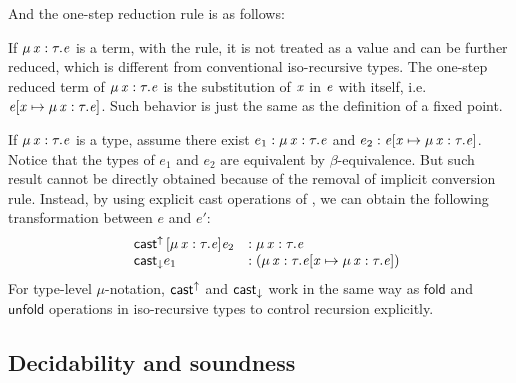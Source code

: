 \begin{figure}[ht]
	\ottusedrule{\ottdruleTXXMu{}}
\end{figure}

And the one-step reduction rule is as follows:

\begin{figure}[ht]
	\ottusedrule{\ottdruleSXXMu{}}
\end{figure}

If $\mu \, \mathit{x}  :  \tau  .  \mathit{e}$ is a term, with the  rule, it is not treated as a value and can be further reduced, which is different from conventional iso-recursive types. The one-step reduced term of $\mu \, \mathit{x}  :  \tau  .  \mathit{e}$ is the substitution of $\mathit{x}$ in $\mathit{e}$ with itself, i.e. $\mathit{e}  [  \mathit{x}  \mapsto  \mu \, \mathit{x}  :  \tau  .  \mathit{e}  ]$. Such behavior is just the same as the definition of a fixed point.

If $\mu \, \mathit{x}  :  \tau  .  \mathit{e}$ is a type, assume there exist $e_1 : \mu \, \mathit{x}  :  \tau  .  \mathit{e}$ and $e_2 : \mathit{e}  [  \mathit{x}  \mapsto  \mu \, \mathit{x}  :  \tau  .  \mathit{e}  ]$. Notice that the types of $e_1$ and $e_2$ are equivalent by $\beta$-equivalence. But such result cannot be directly obtained because of the removal of implicit conversion rule. Instead, by using explicit cast operations of \expcc, we can obtain the following transformation between $e$ and $e'$:
\[\begin{array}{lll}
	&\mathsf{cast}^{\uparrow} \, [  \mu \, \mathit{x}  :  \tau  .  \mathit{e}  ]  \mathit{e_{{\mathrm{2}}}} &: \mu \, \mathit{x}  :  \tau  .  \mathit{e}\\
	& \mathsf{cast}_{\downarrow}  e_1 &: (  \mu \, \mathit{x}  :  \tau  .  \mathit{e}  [  \mathit{x}  \mapsto  \mu \, \mathit{x}  :  \tau  .  \mathit{e}  ]  )
\end{array}\]
For type-level $\mu$-notation, $ \mathsf{cast}^{\uparrow} $ and $ \mathsf{cast}_{\downarrow} $ work in the same way as $\textsf{fold}$ and $\textsf{unfold}$ operations in iso-recursive types to control recursion explicitly.

\subsection{Decidability and soundness}

